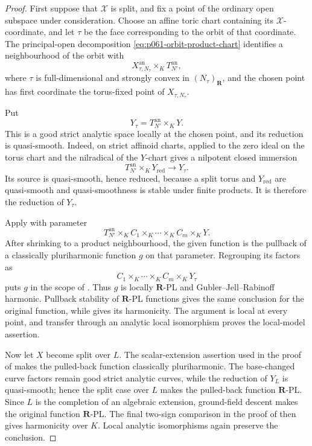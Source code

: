 \begin{proof}
First suppose that $\mathcal X$ is split, and fix a point of the ordinary
open subspace under consideration.  Choose an affine toric chart containing
its $\mathcal X$-coordinate, and let $\tau$ be the face corresponding to
the orbit of that coordinate.  The principal-open decomposition
\eqref{eq:p061-orbit-product-chart} identifies a neighbourhood of the orbit
with
\[
 X_{\tau,N_\tau}^{\mathrm{an}}\times_KT_{N'}^{\mathrm{an}},
\]
where $\tau$ is full-dimensional and strongly convex in
$(N_\tau)_{\mathbf R}$, and the chosen point has first coordinate the
torus-fixed point of $X_{\tau,N_\tau}$.

Put
\[
 Y_\tau=T_{N'}^{\mathrm{an}}\times_KY.
\]
This is a good strict analytic space locally at the chosen point, and its
reduction is quasi-smooth.  Indeed, on strict affinoid charts,
 applied to the zero ideal on the
torus chart and the nilradical of the $Y$-chart gives a nilpotent closed
immersion
\[
 T_{N'}^{\mathrm{an}}\times_KY_{\mathrm{red}}
 \longrightarrow Y_\tau.
\]
Its source is quasi-smooth, hence reduced, because a split torus and
$Y_{\mathrm{red}}$ are quasi-smooth and quasi-smoothness is stable under
finite products.  It is therefore the reduction of $Y_\tau$.

Apply  with parameter
\[
 T_{N'}^{\mathrm{an}}\times_K C_1\times_K\cdots
      \times_K C_m\times_KY.
\]
After shrinking to a product neighbourhood, the given function is the
pullback of a classically pluriharmonic function $g$ on that parameter.
Regrouping its factors as
\[
 C_1\times_K\cdots\times_KC_m\times_KY_\tau
\]
puts $g$ in the scope of
.  Thus $g$ is locally
$\mathbf R$-PL and Gubler--Jell--Rabinoff harmonic.  Pullback stability of
$\mathbf R$-PL functions
\cite[Lemma~5.4(1)]{GJR26} gives the same conclusion for the original
function, while  gives its harmonicity.
The argument is local at every point, and transfer through an analytic local
isomorphism proves the local-model assertion.

Now let $X$ become split over $L$.  The scalar-extension assertion used in
the proof of  makes the pulled-back
function classically pluriharmonic.  The base-changed curve factors remain
good strict analytic curves, while the reduction of $Y_L$ is quasi-smooth;
hence the split case over $L$ makes the pulled-back function $\mathbf R$-PL.
Since $L$ is the completion of an algebraic extension, ground-field descent
\cite[Corollary~5.12]{GJR26} makes the original function $\mathbf R$-PL.
The final two-sign comparison in the proof of
 then gives harmonicity over $K$.
Local analytic isomorphisms again preserve the conclusion.
\end{proof}
